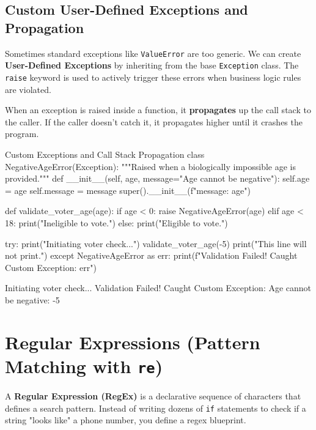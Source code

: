\subsection{Custom User-Defined Exceptions and Propagation}

Sometimes standard exceptions like \texttt{ValueError} are too generic. We can create \textbf{User-Defined Exceptions} by inheriting from the base \texttt{Exception} class. The \texttt{raise} keyword is used to actively trigger these errors when business logic rules are violated.

When an exception is raised inside a function, it \textbf{propagates} up the call stack to the caller. If the caller doesn't catch it, it propagates higher until it crashes the program.

\begin{pythoncode}{Custom Exceptions and Call Stack Propagation}
class NegativeAgeError(Exception):
    """Raised when a biologically impossible age is provided."""
    def __init__(self, age, message="Age cannot be negative"):
        self.age = age
        self.message = message
        super().__init__(f"{message}: {age}")

def validate_voter_age(age):
    if age < 0:
        raise NegativeAgeError(age)
    elif age < 18:
        print("Ineligible to vote.")
    else:
        print("Eligible to vote.")

try:
    print("Initiating voter check...")
    validate_voter_age(-5)
    print("This line will not print.")
except NegativeAgeError as err:
    print(f"Validation Failed! Caught Custom Exception: {err}")
\end{pythoncode}
\begin{outputbox}
Initiating voter check...
Validation Failed! Caught Custom Exception: Age cannot be negative: -5
\end{outputbox}

\section{Regular Expressions (Pattern Matching with \texttt{re})}

A \textbf{Regular Expression (RegEx)} is a declarative sequence of characters that defines a search pattern. Instead of writing dozens of \texttt{if} statements to check if a string "looks like" a phone number, you define a regex blueprint. 

